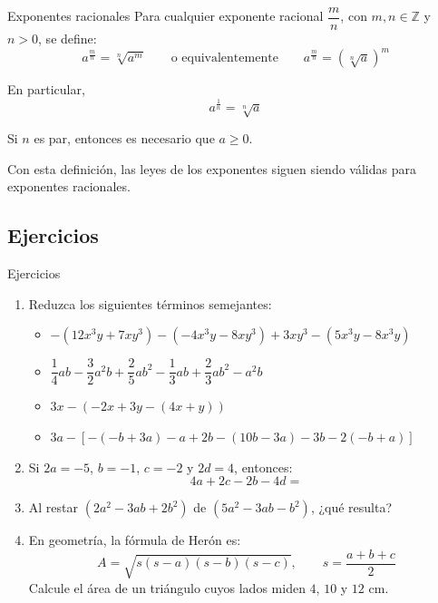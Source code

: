 \documentclass[10pt,handout,aspectratio=169]{beamer}
\newenvironment{stepenumerate}{\begin{enumerate}[<+->]}{\end{enumerate}}
\newenvironment{stepitemize}{\begin{itemize}[<+->]}{\end{itemize}}
\begin{document}
	\begin{frame}{Exponentes racionales}
		Para cualquier exponente racional $\dfrac{m}{n}$, con $m,n\in\mathbb{Z}$ y $n>0$, se define:
		\[
		a^{\frac{m}{n}}=\sqrt[n]{a^{m}}
		\qquad\text{o equivalentemente}\qquad
		a^{\frac{m}{n}}=\left(\sqrt[n]{a}\right)^{m}
		\]
		
		En particular,
		\[
		a^{\frac{1}{n}}=\sqrt[n]{a}
		\]
		
		\medskip
		
		Si $n$ es par, entonces es necesario que $a\geq 0$.
		
		\bigskip
		
		Con esta definición, las leyes de los exponentes siguen siendo válidas para exponentes racionales.
	\end{frame}
	
	\subsection{Ejercicios}
	
	\begin{frame}{Ejercicios}
		\begin{stepenumerate}
			\item Reduzca los siguientes términos semejantes:
			
			\begin{stepitemize}
				\item $-(12x^{3}y+7xy^{3})-(-4x^{3}y-8xy^{3})+3xy^{3}-(5x^{3}y-8x^{3}y)$
				
				\item $\dfrac{1}{4}ab-\dfrac{3}{2}a^{2}b+\dfrac{2}{5}ab^{2}-\dfrac{1}{3}ab+\dfrac{2}{3}ab^{2}-a^{2}b$
				
				\item $3x-\left(-2x+3y-(4x+y)\right)$
				
				\item $3a-[-(-b+3a)-a+2b-(10b-3a)-3b-2(-b+a)]$
			\end{stepitemize}
			
			\item Si $2a=-5$, $b=-1$, $c=-2$ y $2d=4$, entonces:
			\[
			4a+2c-2b-4d=
			\]
			
			\item Al restar $(2a^{2}-3ab+2b^{2})$ de $(5a^{2}-3ab-b^{2})$, ¿qué resulta?
			
			\item En geometría, la fórmula de Herón es:
			\[
			A=\sqrt{s(s-a)(s-b)(s-c)}, \qquad s=\frac{a+b+c}{2}
			\]
			Calcule el área de un triángulo cuyos lados miden $4$, $10$ y $12$ cm.
		\end{stepenumerate}
	\end{frame}
	
\end{document}
